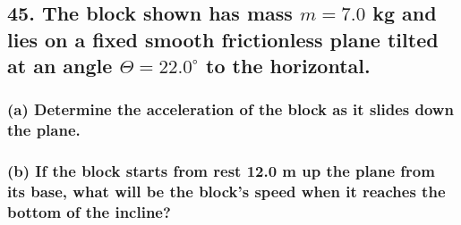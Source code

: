 \documentclass[12pt,a4paper,english]{article}
\begin{document}
\begin{flushleft}
  \subsection{45. The block shown has mass $m=7.0$ kg and lies on a fixed smooth frictionless plane tilted at an angle $\Theta=22.0^\circ$ to the horizontal.}
  \subsubsection{(a) Determine the acceleration of the block as it slides down the plane.}
  \subsubsection{(b) If the block starts from rest 12.0 m up the plane from its base, what will be the block's speed when it reaches the bottom of the incline?}
\end{flushleft}
\end{document}
